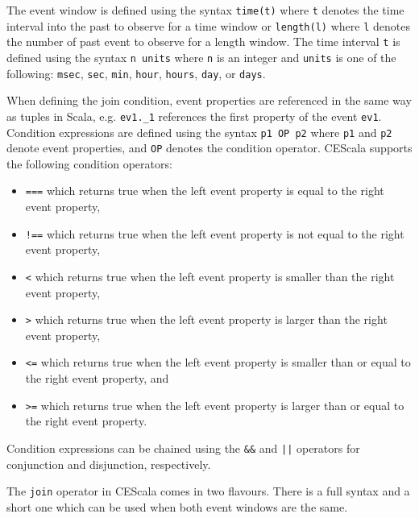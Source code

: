\documentclass[book,type=bsc,colorback,accentcolor=tud8b,12pt,twoside]{tudthesis}
\begin{document}
The event window is defined using the syntax \mbox{\texttt{time(t)}} where \mbox{\texttt{t}} denotes the time interval into the past to observe for a time window or \mbox{\texttt{length(l)}} where \mbox{\texttt{l}} denotes the number of past event to observe for a length window.  The time interval \mbox{\texttt{t}} is defined using the syntax \mbox{\texttt{n units}} where \mbox{\texttt{n}} is an integer and \mbox{\texttt{units}} is one of the following: \mbox{\texttt{msec}}, \mbox{\texttt{sec}}, \mbox{\texttt{min}}, \mbox{\texttt{hour}}, \mbox{\texttt{hours}}, \mbox{\texttt{day}}, or \mbox{\texttt{days}}.  

When defining the join condition, event properties are referenced in the same way as tuples in Scala, e.g. \mbox{\texttt{ev1.\_1}} references the first property of the event \mbox{\texttt{ev1}}.  Condition expressions are defined using the syntax \mbox{\texttt{p1 OP p2}} where \mbox{\texttt{p1}} and \mbox{\texttt{p2}} denote event properties, and \mbox{\texttt{OP}} denotes the condition operator.  CEScala supports the following condition operators:
\begin{itemize}
\item \mbox{\texttt{===}} which returns true when the left event property is equal to the right event property,
\item \mbox{\texttt{!==}}
  which returns true when the left event property is not equal to the right event property,
\item \mbox{\texttt{<}} which returns true when the left event property is smaller than the right event property,
\item \mbox{\texttt{>}} which returns true when the left event property is larger than the right event property,
\item \mbox{\texttt{<=}} which returns true when the left event property is smaller than or equal to the right event property, and
\item \mbox{\texttt{>=}} which returns true when the left event property is larger than or equal to the right event property.
\end{itemize}

Condition expressions can be chained using the \mbox{\texttt{\&\&}} and \mbox{\texttt{||}} operators for conjunction and disjunction, respectively.  

The \mbox{\texttt{join}} operator in CEScala comes in two flavours.  There is a full syntax and a short one which can be used when both event windows are the same.  
\end{document}
